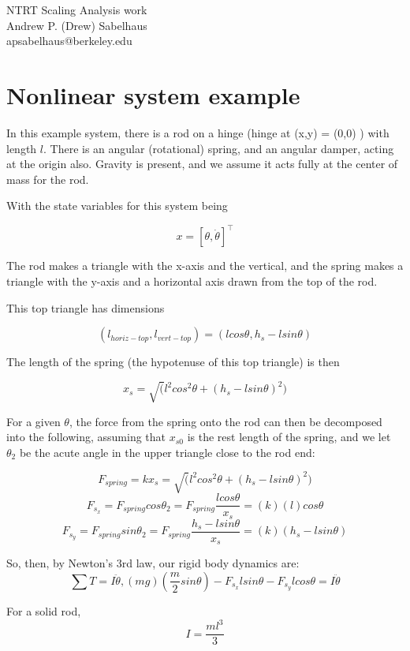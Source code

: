 \documentclass[12pt,letterpaper]{article}
\begin{document}

\begin{center}
\huge
NTRT Scaling Analysis work\\
\normalsize
Andrew P. (Drew) Sabelhaus\\
apsabelhaus@berkeley.edu
\end{center}

\vspace{-2em}

\section{Nonlinear system example}

In this example system, there is a rod on a hinge (hinge at (x,y) = (0,0) ) with length $l$.
There is an angular (rotational) spring, and an angular damper, acting at the origin also.
Gravity is present, and we assume it acts fully at the center of mass for the rod.

With the state variables for this system being

\[
x = [\theta, \dot \theta]^\top
\]

The rod makes a triangle with the x-axis and the vertical, and the spring makes a triangle with the y-axis and a horizontal axis drawn from the top of the rod.

This top triangle has dimensions

\[
(l_{horiz-top}, l_{vert-top}) = (l cos \theta, h_s - l sin\theta)
\]

The length of the spring (the hypotenuse of this top triangle) is then

\[
x_s = \sqrt( l^2 cos^2\theta + (h_s - l sin \theta)^2)
\]

For a given $\theta$, the force from the spring onto the rod can then be decomposed into the following, assuming that $x_{s0}$ is the rest length of the spring, and we let $\theta_2$ be the acute angle in the upper triangle close to the rod end:

\[
F_{spring} = k x_s = \sqrt( l^2 cos^2\theta + (h_s - l sin \theta)^2)
\]
\[
F_{s_x} = F_{spring} cos \theta_2 = F_{spring} \frac{ l cos\theta }{ x_s } = (k)(l)cos\theta
\]
\[
F_{s_y} = F_{spring} sin \theta_2 = F_{spring} \frac{ h_s - l sin\theta}{ x_s} = (k) (h_s - l sin\theta)
\]

So, then, by Newton's 3rd law, our rigid body dynamics are:
\[
\sum T = I \ddot \theta, (mg)(\frac{m}{2} sin\theta) - F_{s_x} l sin\theta - F_{s_y} l cos\theta = I \ddot \theta
\]

For a solid rod,
\[
I = \frac{m l^3}{3}
\]
\end{document}
